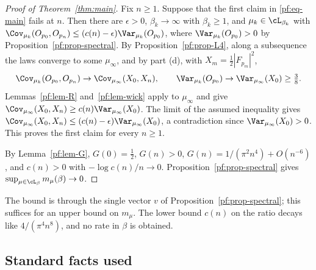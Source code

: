 \begin{proof}[Proof of Theorem~\ref{thm:main}]
Fix $n\ge1$. Suppose that the first claim in \eqref{pf:eq-main} fails at $n$. Then there are $\epsilon>0$, $\beta_k\to\infty$ with $\beta_k\ge1$, and $\mu_k\in\cL_{\beta_k}$ with
$\Cov_{\mu_k}(O_{p_0},O_{p_n})\le(c(n)-\epsilon)\Var_{\mu_k}(O_{p_0})$, where $\Var_{\mu_k}(O_{p_0})>0$ by Proposition~\ref{pf:prop-spectral}. By Proposition~\ref{pf:prop-L4}, along a subsequence the laws converge to some $\mu_\infty$, and by part (d), with $X_m=\tfrac12|F_{p_m}|^2$,
\[
\Cov_{\mu_k}(O_{p_0},O_{p_n})\to\Cov_{\mu_\infty}(X_0,X_n),\qquad\Var_{\mu_k}(O_{p_0})\to\Var_{\mu_\infty}(X_0)\ge\tfrac38 .
\]
Lemmas~\ref{pf:lem-R} and~\ref{pf:lem-wick} apply to $\mu_\infty$ and give $\Cov_{\mu_\infty}(X_0,X_n)\ge c(n)\Var_{\mu_\infty}(X_0)$. The limit of the assumed inequality gives $\Cov_{\mu_\infty}(X_0,X_n)\le(c(n)-\epsilon)\Var_{\mu_\infty}(X_0)$, a contradiction since $\Var_{\mu_\infty}(X_0)>0$. This proves the first claim for every $n\ge1$.

By Lemma~\ref{pf:lem-G}, $G(0)=\tfrac12$, $G(n)>0$, $G(n)=1/(\pi^2n^4)+O(n^{-6})$, and $c(n)>0$ with $-\log c(n)/n\to0$. Proposition~\ref{pf:prop-spectral} gives $\sup_{\mu\in\cL_\beta}m_\mu(\beta)\to0$.
\end{proof}

The bound is through the single vector $v$ of Proposition~\ref{pf:prop-spectral}; this suffices for an upper bound on $m_\mu$. The lower bound $c(n)$ on the ratio decays like $4/(\pi^4n^8)$, and no rate in $\beta$ is obtained.

\subsection{Standard facts used}\label{pf:sec-standard}

